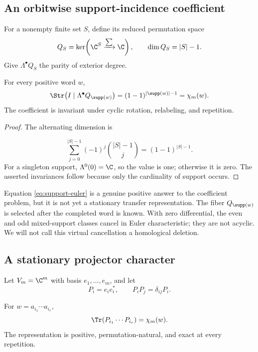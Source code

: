 \subsection{An orbitwise support-incidence coefficient}

For a nonempty finite set \(S\), define its reduced permutation space
\begin{equation}
 Q_S=\ker\!\left(\C^S\xrightarrow{\sum}\C\right),
 \qquad \dim Q_S=|S|-1.
 \label{eq:reduced-support}
\end{equation}
Give \(\Lambda^\bullet Q_S\) the parity of exterior degree.

\begin{lemma}
For every positive word \(w\),
\begin{equation}
 \Str\!\left(I\mid\Lambda^\bullet Q_{\supp(w)}\right)
 =(1-1)^{|\supp(w)|-1}=\chi_m(w).
 \label{eq:support-euler}
\end{equation}
The coefficient is invariant under cyclic rotation, relabeling, and
repetition.
\end{lemma}

\begin{proof}
The alternating dimension is

\[
 \sum_{j=0}^{|S|-1}(-1)^j\binom{|S|-1}{j}=(1-1)^{|S|-1}.
\]
For a singleton support, \(\Lambda^0(0)=\C\), so the value is one; otherwise it
is zero.  The asserted invariances follow because only the cardinality of
support occurs.
\end{proof}

Equation \eqref{eq:support-euler} is a genuine positive answer to the
coefficient problem, but it is not yet a stationary transfer representation.
The fiber \(Q_{\supp(w)}\) is selected after the completed word is known.  With
zero differential, the even and odd mixed-support classes cancel in Euler
characteristic; they are not acyclic.  We will not call this virtual
cancellation a homological deletion.

\subsection{A stationary projector character}

Let \(V_m=\C^m\) with basis \(e_1,\ldots,e_m\), and let
\begin{equation}
 P_i=e_ie_i^*,\qquad P_iP_j=\delta_{ij}P_i.
 \label{eq:projectors}
\end{equation}

\begin{proposition}
For \(w=a_{i_1}\cdots a_{i_r}\),
\begin{equation}
 \Tr(P_{i_1}\cdots P_{i_r})=\chi_m(w).
 \label{eq:projector-selector}
\end{equation}
The representation is positive, permutation-natural, and exact at every
repetition.
\end{proposition}

